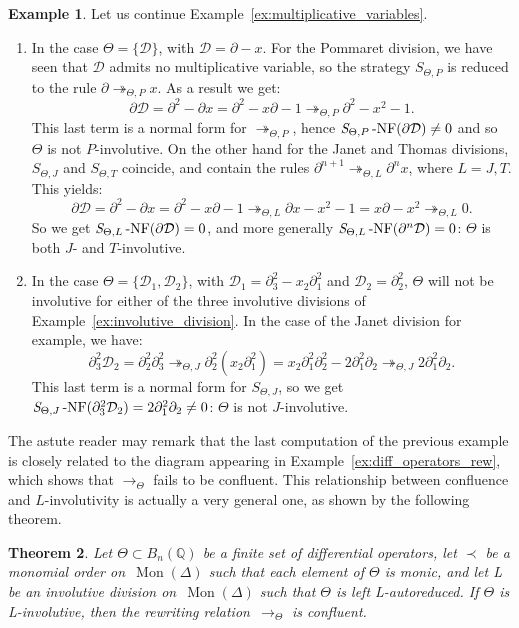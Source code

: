 \documentclass[11pt]{article}
\newtheorem{theorem}{Theorem}[section]
\theoremstyle{definition}
\newtheorem{example}[theorem]{Example}
\newcommand\D{\mathcal{D}}
\newcommand\Q{\mathbb{Q}}
\newcommand\Weyl[1]{B_{#1}(\Q)}
\newcommand\monBasis{\Mon(\Delta)}
\DeclareMathOperator{\Mon}{Mon}
\newcommand\parTheta[1]{\twoheadrightarrow_{\Theta,#1}}
\newcommand\rewTheta{\to_\Theta}
\newcommand{\SThetaNF}[1]{{\it S}_{\Theta,#1}\operatorname{-NF}}
\begin{document}
\begin{example}
Let us continue Example~\ref{ex:multiplicative_variables}.
\begin{enumerate}
\item In the case $\Theta = \{ \D \}$, with $\D = \partial - x$. For the
  Pommaret division, we have seen that $\D$ admits no multiplicative
  variable, so the strategy $S_{\Theta,P}$ is reduced to the rule
  $\partial\parTheta{P} x$. As a result we get:
  \[\partial \D = \partial^2 - \partial x = \partial^2 - x \partial - 1
  \parTheta{P} \partial^2 - x^2 - 1.
  \]
  This last term is a normal form for $\parTheta{P}$, hence
  $\SThetaNF{P}(\partial\D) \neq 0$ and so $\Theta$ is not
  $P$-involutive. On the other hand for the Janet and Thomas divisions,
  $S_{\Theta,J}$ and $S_{\Theta,T}$ coincide, and contain the rules
  $\partial^{n+1}\parTheta{L}\partial^n x$, where $L=J,T$. This yields:
  \[
  \partial\D=\partial^2-\partial x=\partial^2-x\partial-1\parTheta{L}
  \partial x-x^2-1=x\partial -x^2 \parTheta{L}0.
  \]
  So we get $\SThetaNF{L}(\partial\D) = 0$, and more generally
  $\SThetaNF{L}(\partial^n\D) = 0$: $\Theta$ is both  $J$- and
  $T$-involutive.  
\item In the case $\Theta = \{ \D_1 , \D_2 \}$, with
  $\D_1 = \partial_3^2 - x_2 \partial_1^2$ and $\D_2 = \partial_2^2$,
  $\Theta$ will not be involutive for either of the three involutive
  divisions of Example~\ref{ex:involutive_division}. In the case of the
  Janet division for example, we have:
  \[
    \partial_3^2 \D_2 = \partial_2^2 \partial_3^2
    \parTheta{J} \partial_2^2 (x_2 \partial_1^2) =
    x_2 \partial_1^2 \partial_2^2 - 2 \partial_1^2 \partial_2
    \parTheta{J} 2 \partial_1^2 \partial_2.
  \]
  This last term is a normal form for $S_{\Theta,J}$, so we get
  $\SThetaNF{J}(\partial_3^2 \D_2) = 2 \partial_1^2 \partial_2
  \neq 0$: $\Theta$ is not $J$-involutive. 
\end{enumerate}
\end{example}

The astute reader may remark that the last computation of the previous
example is closely related to the diagram appearing in 
Example~\ref{ex:diff_operators_rew}, which shows that $\rewTheta$ fails
to be confluent. This relationship between confluence and
$L$-involutivity is actually a very general one, as shown by the
following theorem.
\medskip

\begin{theorem}\label{thm:involutive_conf}
  Let $\Theta\subset\Weyl{n}$ be a finite set of differential operators,
  let $\prec$ be a monomial order on~$\monBasis$ such that each element
  of $\Theta$ is monic, and let L be an involutive division 
  on~$\monBasis$ such that $\Theta$ is left L-autoreduced. If $\Theta$ is
  L-involutive, then the rewriting relation~$\rewTheta$ is confluent.
\end{theorem}
\end{document}
